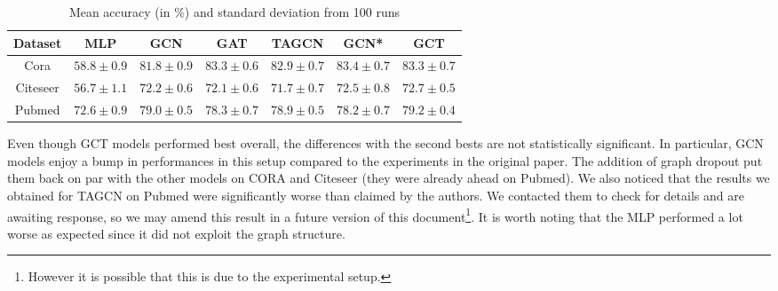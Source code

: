 \begin{table}[H]
\begin{center}
  \bgroup
  \def\arraystretch{1.5}%
  \begin{tabular}{|c|c|c|c|c|c|c|}
    \hline
    Dataset & MLP & GCN & GAT & TAGCN & GCN* & GCT\\
    \hline
    \hline
    Cora & $58.8 \pm 0.9$ & $81.8 \pm 0.9$ & $83.3 \pm 0.6$ & $82.9 \pm 0.7$ & $\mathbf{83.4} \pm 0.7$ & $83.3 \pm 0.7$\\
    \hline
    Citeseer & $56.7 \pm 1.1$ & $72.2 \pm 0.6$ & $72.1 \pm 0.6$ & $71.7 \pm 0.7$ & $72.5 \pm 0.8$ & $\mathbf{72.7} \pm 0.5$\\
    \hline
    Pubmed & $72.6 \pm 0.9$ & $79.0 \pm 0.5$ & $78.3 \pm 0.7$ & $78.9 \pm 0.5$ & $78.2 \pm 0.7$ & $\mathbf{79.2} \pm 0.4$\\
    \hline
  \end{tabular}
  \egroup
\end{center}
\caption{Mean accuracy (in \%) and standard deviation from 100 runs}
\label{tab:lss}
\end{table}

Even though GCT models performed best overall, the differences with the second bests are not statistically significant. In particular, GCN models enjoy a bump in performances in this setup compared to the experiments in the original paper. The addition of graph dropout put them back on par with the other models on CORA and Citeseer (they were already ahead on Pubmed). We also noticed that the results we obtained for TAGCN on Pubmed were significantly worse than claimed by the authors. We contacted them to check for details and are awaiting response, so we may amend this result in a future version of this document\footnote{However it is possible that this is due to the experimental setup.}. It is worth noting that the MLP performed a lot worse as expected since it did not exploit the graph structure.